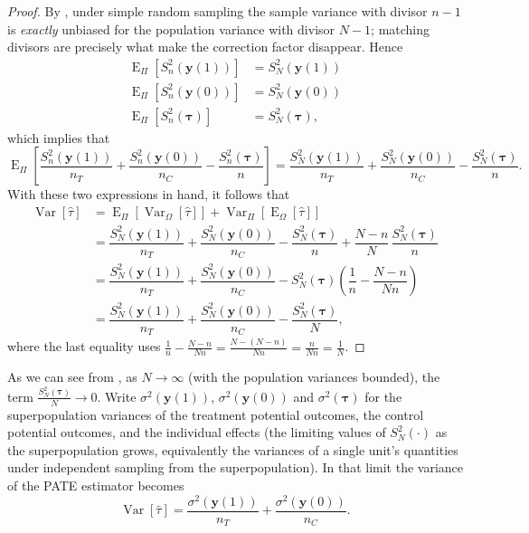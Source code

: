\documentclass[12pt,leqno]{article}
\theoremstyle{newstyle}
\DeclareMathOperator{\E}{\mathrm{E}}
\DeclareMathOperator{\Var}{\mathrm{Var}}
\newcommand{\EZ}{\E_{\Omega}}    \newcommand{\VarZ}{\Var_{\Omega}}  %
\newcommand{\ER}{\E_{\Pi}}       \newcommand{\VarR}{\Var_{\Pi}}     %
\newcommand{\pov}[1]{\bm{y}(#1)}    %
\newcommand{\tauhat}{\hat{\tau}}
\newcommand{\Ssq}[2][n]{S_{#1}^{2}(#2)}
\newcommand{\ssq}[2][n]{\sigma_{#1}^{2}(#2)}
\begin{document}
\begin{proof}
By \citet[][Theorem 2.4]{cochran1977}, under simple random sampling the sample variance with divisor $n - 1$ is \textit{exactly} unbiased for the population variance with divisor $N - 1$; matching divisors are precisely what make the correction factor disappear. Hence
\small
\begin{align*}
\ER\left[\Ssq{\pov{1}}\right] & = \Ssq[N]{\pov{1}} \\
\ER\left[\Ssq{\pov{0}}\right] & = \Ssq[N]{\pov{0}} \\
\ER\left[\Ssq{\bm{\tau}}\right] & = \Ssq[N]{\bm{\tau}},
\end{align*}
\normalsize
which implies that
\small
\begin{equation*}
\ER\left[\dfrac{\Ssq{\pov{1}}}{n_T} + \dfrac{\Ssq{\pov{0}}}{n_C} - \dfrac{\Ssq{\bm{\tau}}}{n}\right] = \dfrac{\Ssq[N]{\pov{1}}}{n_T} + \dfrac{\Ssq[N]{\pov{0}}}{n_C} - \dfrac{\Ssq[N]{\bm{\tau}}}{n}.
\end{equation*}
\normalsize
With these two expressions in hand, it follows that
\small
\begin{align*}
\Var\left[\tauhat\right] & = \ER\left[\VarZ\left[\tauhat\right]\right] + \VarR\left[\EZ\left[\tauhat\right]\right] \\[1ex]
& = \dfrac{\Ssq[N]{\pov{1}}}{n_T} + \dfrac{\Ssq[N]{\pov{0}}}{n_C} - \dfrac{\Ssq[N]{\bm{\tau}}}{n} + \dfrac{N - n}{N} \, \dfrac{\Ssq[N]{\bm{\tau}}}{n} \\[1ex]
& = \dfrac{\Ssq[N]{\pov{1}}}{n_T} + \dfrac{\Ssq[N]{\pov{0}}}{n_C} - \Ssq[N]{\bm{\tau}}\left(\dfrac{1}{n} - \dfrac{N - n}{Nn}\right) \\[1ex]
& = \dfrac{\Ssq[N]{\pov{1}}}{n_T} + \dfrac{\Ssq[N]{\pov{0}}}{n_C} - \dfrac{\Ssq[N]{\bm{\tau}}}{N},
\end{align*}
\normalsize
where the last equality uses $\frac{1}{n} - \frac{N - n}{Nn} = \frac{N - (N - n)}{Nn} = \frac{n}{Nn} = \frac{1}{N}$.
\end{proof}
As we can see from , as $N \to \infty$ (with the population variances bounded), the term $\frac{\Ssq[N]{\bm{\tau}}}{N} \to 0$. Write $\ssq[]{\pov{1}}$, $\ssq[]{\pov{0}}$ and $\ssq[]{\bm{\tau}}$ for the superpopulation variances of the treatment potential outcomes, the control potential outcomes, and the individual effects (the limiting values of $\Ssq[N]{\cdot}$ as the superpopulation grows, equivalently the variances of a single unit's quantities under independent sampling from the superpopulation). In that limit the variance of the PATE estimator becomes
\begin{equation}
\label{eq: pate var superpop}
\Var\left[\tauhat\right] = \dfrac{\ssq[]{\pov{1}}}{n_T} + \dfrac{\ssq[]{\pov{0}}}{n_C}.
\end{equation}
\end{document}
